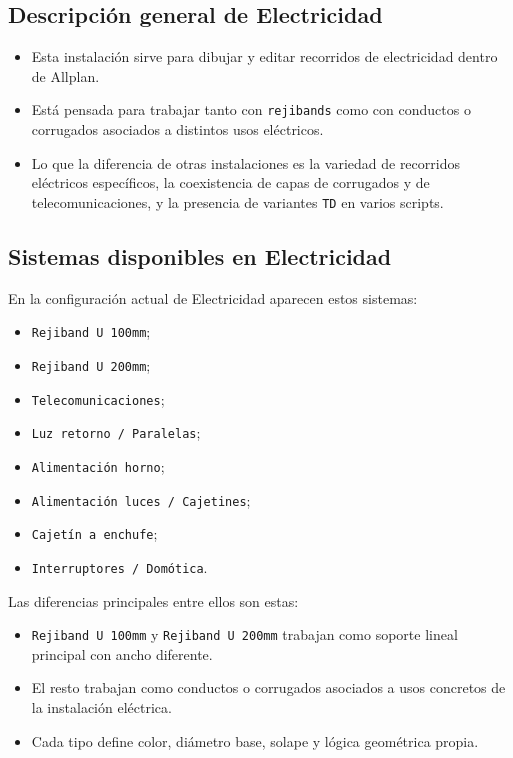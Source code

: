 \documentclass[12pt,a4paper]{article}
\begin{document}
\subsection{Descripción general de Electricidad}

\begin{itemize}
\item Esta instalación sirve para dibujar y editar recorridos de electricidad dentro de Allplan.
\item Está pensada para trabajar tanto con \texttt{rejibands} como con conductos o corrugados asociados a distintos usos eléctricos.
\item Lo que la diferencia de otras instalaciones es la variedad de recorridos eléctricos específicos, la coexistencia de capas de corrugados y de telecomunicaciones, y la presencia de variantes \texttt{TD} en varios scripts.
\end{itemize}

\subsection{Sistemas disponibles en Electricidad}

En la configuración actual de Electricidad aparecen estos sistemas:

\begin{itemize}
\item \texttt{Rejiband U 100mm};
\item \texttt{Rejiband U 200mm};
\item \texttt{Telecomunicaciones};
\item \texttt{Luz retorno / Paralelas};
\item \texttt{Alimentación horno};
\item \texttt{Alimentación luces / Cajetines};
\item \texttt{Cajetín a enchufe};
\item \texttt{Interruptores / Domótica}.
\end{itemize}

Las diferencias principales entre ellos son estas:

\begin{itemize}
\item \texttt{Rejiband U 100mm} y \texttt{Rejiband U 200mm} trabajan como soporte lineal principal con ancho diferente.
\item El resto trabajan como conductos o corrugados asociados a usos concretos de la instalación eléctrica.
\item Cada tipo define color, diámetro base, solape y lógica geométrica propia.
\end{itemize}
\end{document}
